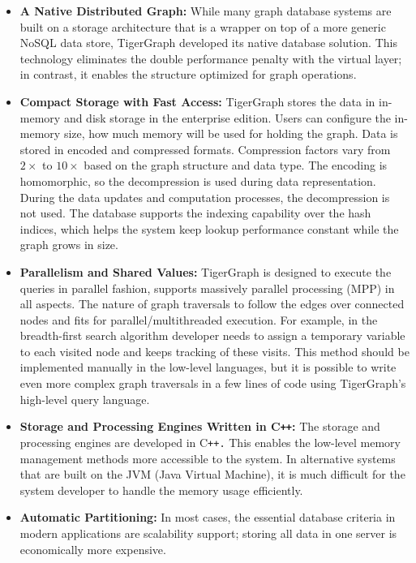 \begin{itemize}
  \item \textbf{A Native Distributed Graph:}
  While many graph database systems are built on a storage architecture that is a wrapper on top of a more generic NoSQL data store,
  TigerGraph developed its native database solution.
  This technology eliminates the double performance penalty with the virtual layer; in contrast, it enables the structure optimized for graph operations. 
  \item \textbf{Compact Storage with Fast Access:}
  TigerGraph stores the data in in-memory and disk storage in the enterprise edition.
  Users can configure the in-memory size, how much memory will be used for holding the graph.
  Data is stored in encoded and compressed formats.
  Compression factors vary from $2\times$ to $10\times$ based on the graph structure and data type.
  The encoding is homomorphic, so the decompression is used during data representation.
  During the data updates and computation processes, the decompression is not used.
  The database supports the indexing capability over the hash indices, which helps the system keep lookup performance constant while the graph grows in size.
  \item \textbf{Parallelism and Shared Values:}
  TigerGraph is designed to execute the queries in parallel fashion, supports massively parallel processing (MPP) in all aspects.
  The nature of graph traversals to follow the edges over connected nodes and fits for parallel/multithreaded execution.
  For example, in the breadth-first search algorithm developer needs to assign a temporary variable to each visited node and keeps tracking of these visits.
  This method should be implemented manually in the low-level languages, but it is possible to write even more complex graph traversals in a few lines of code using TigerGraph’s high-level query language.
  \item \textbf{Storage and Processing Engines Written in C\texttt{++}:}
  The storage and processing engines are developed in C\texttt{++.} 
  This enables the low-level memory management methods more accessible to the system.
  In alternative systems that are built on the JVM (Java Virtual Machine), it is much difficult for the system developer to handle the memory usage efficiently.
  \item \textbf{Automatic Partitioning:}
  In most cases, the essential database criteria in modern applications are scalability support; storing all data in one server is economically more expensive.

\end{itemize}
